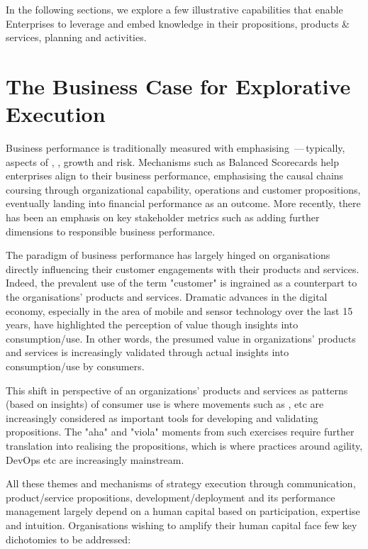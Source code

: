 In the following sections, we explore a few illustrative capabilities that enable Enterprises to leverage and embed
knowledge in their propositions, products \& services, planning and activities.

\section*{The Business Case for Explorative Execution}

Business performance is traditionally measured with  emphasising
\,---\,typically, aspects of , ,
growth and risk.
Mechanisms such as Balanced Scorecards help enterprises align 
to their business performance, emphasising the causal chains coursing through organizational capability, operations and
customer propositions, eventually landing into financial performance as an outcome.
More recently, there has been an emphasis on key stakeholder metrics such as  adding further
dimensions to responsible business performance.

The paradigm of business performance has largely hinged on organisations directly influencing their customer
engagements with their products and services.
Indeed, the prevalent use of the term "customer" is ingrained as a counterpart to the organisations’
products and services.
Dramatic advances in the digital economy, especially in the area of mobile and sensor technology over the last 15 years,
have highlighted the perception of value though insights into consumption/use.
In other words, the presumed value in organizations’ products and services is increasingly validated through
actual insights into consumption/use by consumers.

This shift in perspective of an organizations’ products and services as patterns (based on insights) of consumer use
is where movements such as ,  etc are increasingly considered
as important tools for developing and validating propositions.
The "aha" and "viola" moments from such exercises require further translation into realising the propositions,
which is where practices around agility, DevOps etc are increasingly mainstream.

All these themes and mechanisms of strategy execution through communication, product/service propositions,
development/deployment and its performance management
largely depend on a human capital based on participation, expertise and intuition.
Organisations wishing to amplify their human capital face few key dichotomies to be addressed:

